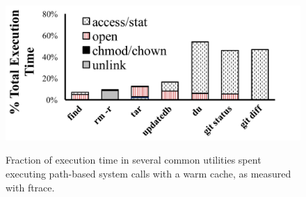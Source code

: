 


\begin{figure}[t]
\scriptsize
\centering
\includegraphics[width=\linewidth]{dcache/plots/syscall-percentage.pdf} \\
\vspace{-10pt}
\caption{Fraction of execution time in several common utilities spent
executing path-based system calls with a warm cache, as measured with ftrace.
}
\label{fig:lookup-frac}
\end{figure}


